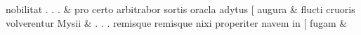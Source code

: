 \documentclass[12pt,onecolumn,twoside,a4paper]{memoir}
\begin{document}
\begin{pairs}
\begin{Leftside}
                              nobilitat
                              .
                              .
                              . \&
                         \stanza {}
                     pro
                              certo
                              arbitrabor
                              sortis
                              oracla
                              adytus
                              [
                              augura \&
                         \stanza {}
                     flucti
                              cruoris
                              volverentur
                              Mysii \&
                         \stanza {}.
                              .
                              .
                              remisque
                              {remisque}
                              nixi
                              properiter
                              navem
                              in
                              [
                              fugam & 
                     

\end{Leftside}
\end{pairs}
\end{document}

